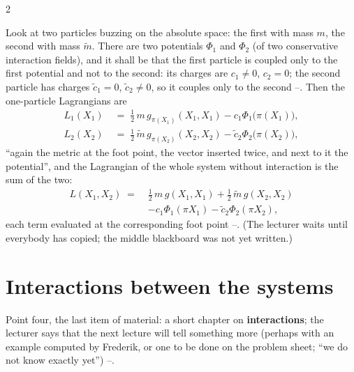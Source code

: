 \begin{paracol}{2}
\begin{example}\label{ex:mp-two}
Look at two particles buzzing on the absolute space: the first with mass $m$, the second with mass $\tilde m$. There are two potentials $\Phi_1$ and $\Phi_2$ (of two conservative interaction fields), and it shall be that the first particle is coupled only to the first potential and not to the second: its charges are $c_1\neq0$, $c_2=0$; the second particle has charges $\tilde c_1=0$, $\tilde c_2\neq0$, so it couples only to the second --. Then the one-particle Lagrangians are
\begin{equation}\label{eq:mp-L12}
  \begin{aligned}
  L_1(X_1)&\;=\;\tfrac12\,m\,g_{\pi(X_1)}(X_1,X_1)-c_1\Phi_1\bigl(\pi(X_1)\bigr),\\
  L_2(X_2)&\;=\;\tfrac12\,\tilde m\,g_{\pi(X_2)}(X_2,X_2)-\tilde c_2\Phi_2\bigl(\pi(X_2)\bigr),
  \end{aligned}
\end{equation}
``again the metric at the foot point, the vector inserted twice, and next to it the potential'', and the Lagrangian of the whole system without interaction is the sum of the two:
\begin{equation}\label{eq:mp-L12sum}
  \begin{aligned}
  L(X_1,X_2)\;=\;&\tfrac12\,m\,g(X_1,X_1)+\tfrac12\,\tilde m\,g(X_2,X_2)\\&-c_1\Phi_1(\pi X_1)-\tilde c_2\Phi_2(\pi X_2),
  \end{aligned}
\end{equation}
each term evaluated at the corresponding foot point --. (The lecturer waits until everybody has copied; the middle blackboard was not yet written.)
\end{example}

\section{Interactions between the systems}\label{sec:mp-interaction}

Point four, the last item of material: a short chapter on \textbf{interactions}; the lecturer says that the next lecture will tell something more (perhaps with an example computed by Frederik, or one to be done on the problem sheet; ``we do not know exactly yet'') --.


\end{paracol}
